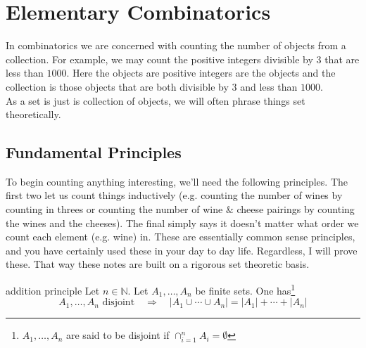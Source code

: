 \documentclass{article}
\newcounter{definitioncount} %
\newcounter{lemmacount}
\newcounter{examplecount}
\newcounter{theoremcount}
\newcounter{propositioncount}
\newcounter{corollarycount}
\newcounter{remarkcount}
\newcounter{problemcount}
\newcounter{exercisecount}
\begin{document}
\newpage

\tableofcontents

\newpage

\section{Elementary Combinatorics}

\setcounter{lemmacount}{1}
\setcounter{examplecount}{1}
\setcounter{theoremcount}{1}
\setcounter{propositioncount}{1}
\setcounter{corollarycount}{1}
\setcounter{remarkcount}{1}
\setcounter{definitioncount}{1}
\setcounter{problemcount}{1}
\setcounter{exercisecount}{1}

In combinatorics we are concerned with counting the number of objects from a collection. For example, we may count the positive integers divisible
by $3$ that are less than $1000$. Here the objects are positive integers are the objects and the collection is those objects that are both divisible 
by $3$ and less than $1000$. \\

As a set is just is collection of objects, we will often phrase things set theoretically. 

\subsection{Fundamental Principles}


To begin counting anything interesting, we'll need the following principles. The first two let us count things inductively (e.g. counting 
the number of wines by counting in threes or counting the number of wine $\&$ cheese pairings by counting the wines and the cheeses). 
The final simply says it doesn't matter what order we count each element (e.g. wine) in. These are essentially 
common sense principles, and you have certainly used these in your day to day life. Regardless, I will prove these. 
That way these notes are built on a rigorous set theoretic basis.

\begin{theorem}[]{addition principle}
    Let $n \in \mathbb{N}$. Let $A_1, \dots, A_n$ be finite sets. One has\footnote{$A_1, \dots, A_n$ are said to be disjoint if 
    $\cap_{i=1}^n A_i = \emptyset$}
    \[A_1, \dots, A_n \text{ disjoint} \quad \Longrightarrow \quad |A_1 \cup \cdots \cup A_n| = |A_1| + \cdots + |A_n|\]
\end{theorem}
\end{document}

